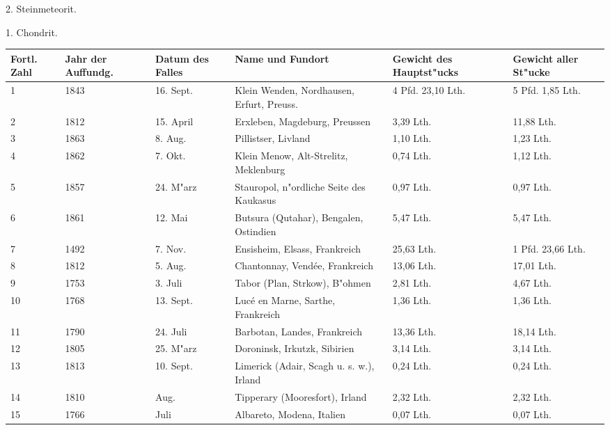 \documentclass[a4paper, 11pt, oneside, german]{article}
\begin{document}
\clearpage
\begin{center}
2. Steinmeteorit.
\end{center}
\begin{center}
1. Chondrit.
\end{center}
\begin{center}
\begin{footnotesize}
\begin{tabular}{ |p{7mm}|p{7mm}|p{13mm}|p{48mm}|p{22mm}|p{22mm}| }
    \hline
    Fortl. Zahl & Jahr der Auffundg. & Datum des Falles & Name und Fundort & Gewicht des Hauptst"ucks & Gewicht aller St"ucke\\
    \hline\hline
    1 & 1843 & 16. Sept. & Klein Wenden, Nordhausen, Erfurt, Preuss. & 4 Pfd. 23,10 Lth. & 5 Pfd. 1,85 Lth.\\\hline
    2 & 1812 & 15. April & Erxleben, Magdeburg, Preussen & 3,39 Lth. & 11,88 Lth.\\\hline
    3 & 1863 & 8. Aug. & Pillistser, Livland & 1,10 Lth. & 1,23 Lth.\\\hline
    4 & 1862 & 7. Okt. & Klein Menow, Alt-Strelitz, Meklenburg & 0,74 Lth. & 1,12 Lth.\\\hline
    5 & 1857 & 24. M"arz & Stauropol, n"ordliche Seite des Kaukasus & 0,97 Lth. & 0,97 Lth.\\\hline
    6 & 1861 & 12. Mai & Butsura (Qutahar), Bengalen, Ostindien & 5,47 Lth. & 5,47 Lth.\\\hline
    7 & 1492 & 7. Nov. & Ensisheim, Elsass, Frankreich & 25,63 Lth. & 1 Pfd. 23,66 Lth.\\\hline
    8 & 1812 & 5. Aug. & Chantonnay, Vendée, Frankreich & 13,06 Lth. & 17,01 Lth.\\\hline
    9 & 1753 & 3. Juli & Tabor (Plan, Strkow), B"ohmen & 2,81 Lth. & 4,67 Lth.\\\hline
    10 & 1768 & 13. Sept. & Lucé en Marne, Sarthe, Frankreich & 1,36 Lth. & 1,36 Lth.\\\hline
    11 & 1790 & 24. Juli & Barbotan, Landes, Frankreich & 13,36 Lth. & 18,14 Lth.\\\hline
    12 & 1805 & 25. M"arz & Doroninsk, Irkutzk, Sibirien & 3,14 Lth. & 3,14 Lth.\\\hline
    13 & 1813 & 10. Sept. & Limerick (Adair, Scagh u. s. w.), Irland & 0,24 Lth. & 0,24 Lth.\\\hline
    14 & 1810 & Aug. & Tipperary (Mooresfort), Irland & 2,32 Lth. & 2,32 Lth.\\\hline
    15 & 1766 & Juli & Albareto, Modena, Italien & 0,07 Lth. & 0,07 Lth.\\\hline

\end{tabular}
\end{footnotesize}
\end{center}
\end{document}
